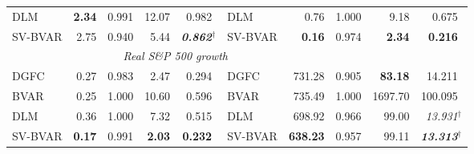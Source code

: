 \begin{tabular}{@{}lrrrr@{\qquad}lrrrr@{}}
DLM       & \textbf{2.34} & 0.991 & 12.07 & 0.982$^{\phantom{\dagger}}$ & DLM       & 0.76 & 1.000 & 9.18 & 0.675$^{\phantom{\dagger}}$ \\
SV-BVAR   & 2.75 & 0.940 & 5.44 & \textit{\textbf{0.862}}$^{\dagger}$ & SV-BVAR   & \textbf{0.16} & 0.974 & \textbf{2.34} & \textbf{0.216}$^{\phantom{\dagger}}$ \\
\addlinespace
\multicolumn{5}{c}{\textit{Yield spread}} & \multicolumn{5}{c}{\textit{Real S\&P 500 growth}} \\
\cmidrule(r){1-5}\cmidrule(l){6-10}
DGFC      & 0.27 & 0.983 & 2.47 & 0.294$^{\phantom{\dagger}}$ & DGFC      & 731.28 & 0.905 & \textbf{83.18} & 14.211$^{\phantom{\dagger}}$ \\
BVAR      & 0.25 & 1.000 & 10.60 & 0.596$^{\phantom{\dagger}}$ & BVAR      & 735.49 & 1.000 & 1697.70 & 100.095$^{\phantom{\dagger}}$ \\
DLM       & 0.36 & 1.000 & 7.32 & 0.515$^{\phantom{\dagger}}$ & DLM       & 698.92 & 0.966 & 99.00 & \textit{13.931}$^{\dagger}$ \\
SV-BVAR   & \textbf{0.17} & 0.991 & \textbf{2.03} & \textbf{0.232}$^{\phantom{\dagger}}$ & SV-BVAR   & \textbf{638.23} & 0.957 & 99.11 & \textit{\textbf{13.313}}$^{\dagger}$ \\
\bottomrule
\end{tabular}
